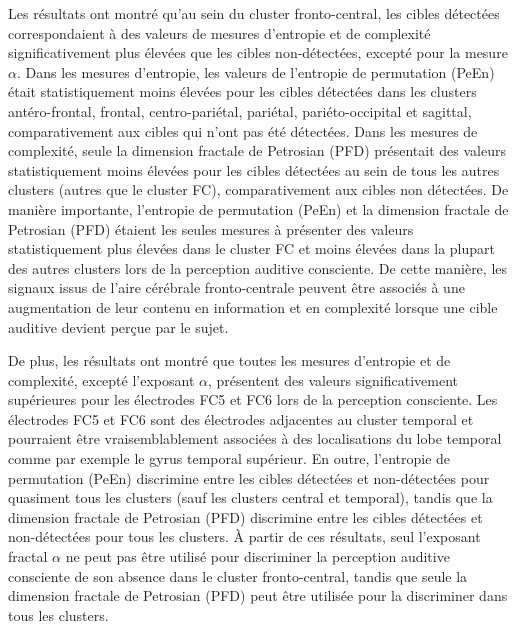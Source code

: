 Les résultats ont montré qu'au sein du cluster fronto-central, les cibles détectées correspondaient à des valeurs de mesures d'entropie et de complexité significativement plus élevées que les cibles non-détectées, excepté pour la mesure $\alpha$.
Dans les mesures d'entropie, les valeurs de l'entropie de permutation (PeEn) était statistiquement moins élevées pour les cibles détectées dans les clusters antéro-frontal, frontal, centro-pariétal, pariétal, pariéto-occipital et sagittal, comparativement aux cibles qui n'ont pas été détectées.  
Dans les mesures de complexité, seule la dimension fractale de Petrosian (PFD) présentait des valeurs statistiquement moins élevées pour les cibles détectées au sein de tous les autres clusters (autres que le cluster FC), comparativement aux cibles non détectées. 
De manière importante, l'entropie de permutation (PeEn) et la dimension fractale de Petrosian (PFD) étaient les seules mesures à présenter des valeurs statistiquement plus élevées dans le cluster FC et moins élevées dans la plupart des autres clusters lors de la perception auditive consciente. 
De cette manière, les signaux issus de l'aire cérébrale fronto-centrale peuvent être associés à une augmentation de leur contenu en information et en complexité lorsque une cible auditive devient perçue par le sujet. 

De plus, les résultats ont montré que toutes les mesures d'entropie et de complexité, excepté l'exposant $\alpha$, présentent des valeurs significativement supérieures pour les électrodes FC5 et FC6 lors de la perception consciente. 
Les électrodes FC5 et FC6 sont des électrodes adjacentes au cluster temporal et pourraient être vraisemblablement associées à des localisations du lobe temporal comme par exemple le gyrus temporal supérieur. 
En outre, l'entropie de permutation (PeEn) discrimine entre les cibles détectées et non-détectées pour quasiment tous les clusters (sauf les clusters central et temporal), tandis que la dimension fractale de Petrosian (PFD) discrimine entre les cibles détectées et non-détectées pour tous les clusters.
À partir de ces résultats, seul l'exposant fractal $\alpha$ ne peut pas être utilisé pour discriminer la perception auditive consciente de son absence dans le cluster fronto-central, tandis que seule la dimension fractale de Petrosian (PFD) peut être utilisée pour la discriminer dans tous les clusters. 

